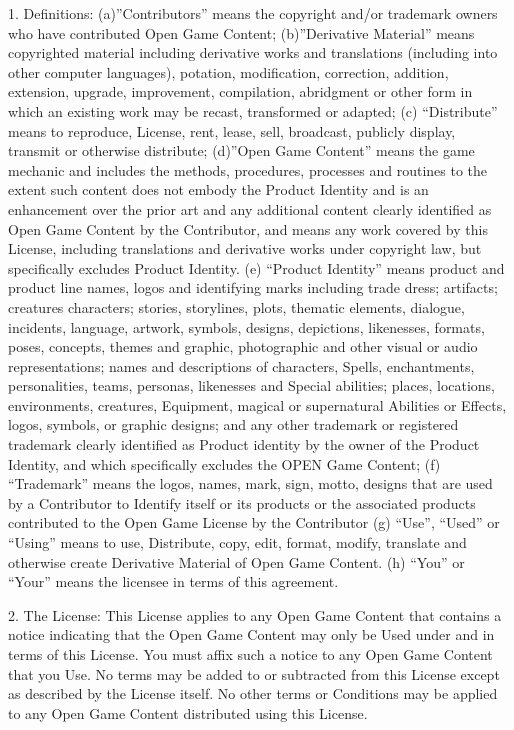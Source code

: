 \documentclass[letterpaper,twocolumn,openany,nodeprecatedcode]{dndbook}
\begin{document}
1. Definitions: (a)”Contributors” means the copyright and/or trademark owners who have contributed Open Game Content; (b)”Derivative Material” means copyrighted material including derivative works and translations (including into other computer languages), potation, modification, correction, addition, extension, upgrade, improvement, compilation, abridgment or other form in which an existing work may be recast, transformed or adapted; (c) “Distribute” means to reproduce, License, rent, lease, sell, broadcast, publicly display, transmit or otherwise distribute; (d)”Open Game Content” means the game mechanic and includes the methods, procedures, processes and routines to the extent such content does not embody the Product Identity and is an enhancement over the prior art and any additional content clearly identified as Open Game Content by the Contributor, and means any work covered by this License, including translations and derivative works under copyright law, but specifically excludes Product Identity. (e) “Product Identity” means product and product line names, logos and identifying marks including trade dress; artifacts; creatures characters; stories, storylines, plots, thematic elements, dialogue, incidents, language, artwork, symbols, designs, depictions, likenesses, formats, poses, concepts, themes and graphic, photographic and other visual or audio representations; names and descriptions of characters, Spells, enchantments, personalities, teams, personas, likenesses and Special abilities; places, locations, environments, creatures, Equipment, magical or supernatural Abilities or Effects, logos, symbols, or graphic designs; and any other trademark or registered trademark clearly identified as Product identity by the owner of the Product Identity, and which specifically excludes the OPEN Game Content; (f) “Trademark” means the logos, names, mark, sign, motto, designs that are used by a Contributor to Identify itself or its products or the associated products contributed to the Open Game License by the Contributor (g) “Use”, “Used” or “Using” means to use, Distribute, copy, edit, format, modify, translate and otherwise create Derivative Material of Open Game Content. (h) “You” or “Your” means the licensee in terms of this agreement.

2. The License: This License applies to any Open Game Content that contains a notice indicating that the Open Game Content may only be Used under and in terms of this License. You must affix such a notice to any Open Game Content that you Use. No terms may be added to or subtracted from this License except as described by the License itself. No other terms or Conditions may be applied to any Open Game Content distributed using this License.
\end{document}
